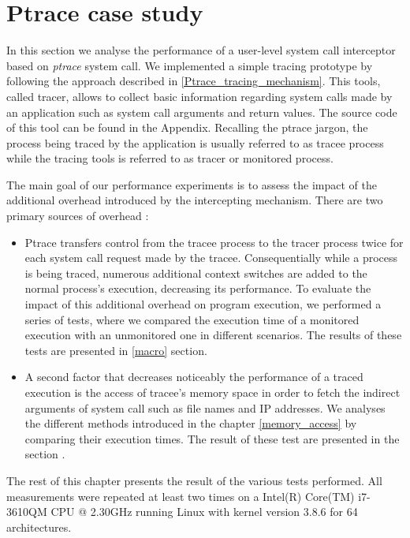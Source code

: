 \chapter{Ptrace  case study}

In this section we analyse the performance of a user-level system call interceptor based on \emph{ptrace} system call. We implemented a simple tracing prototype  by following the approach described in \ref{Ptrace_tracing_mechanism}. This tools, called tracer, allows to collect basic information regarding system calls made by an application such as system call arguments and return values. The source code of this tool can be found in the Appendix. Recalling the ptrace jargon, the process being traced by the application is usually referred to as tracee process while the tracing tools is referred to as tracer or monitored process. 

The main goal of our performance experiments is to assess the impact of the additional overhead introduced by the intercepting mechanism. There are two primary sources of overhead : 

\begin{itemize}
\item Ptrace transfers control from the tracee process to the tracer process twice for each system call request made by the  tracee. Consequentially while a process is being 
	  traced, numerous additional context switches are added to the normal process's execution, decreasing its performance. To evaluate the impact of this additional overhead on 
	  program execution, we performed a series of tests, where we compared the execution time of a monitored execution with an unmonitored one in different scenarios. The results
	  of these tests are presented in \ref{macro} section.

\item A second factor that decreases noticeably the performance of a traced execution is the access of tracee's memory space in order to fetch the indirect arguments of system call such as file names and IP addresses. We analyses the different methods introduced in the chapter \ref{memory_access} by comparing their execution times. The result of these test are presented in the section \cite{micro}. 

\end{itemize}

The rest of this chapter presents the result of the various tests performed. All measurements were repeated at least two times on a Intel(R) Core(TM) i7-3610QM CPU @ 2.30GHz
running Linux with kernel version 3.8.6 for 64 architectures. 


